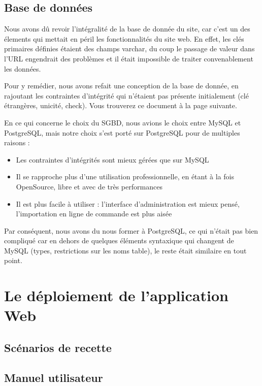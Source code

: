 \documentclass[11pt]{report}
\begin{document}
\section{Base de données}
Nous avons dû revoir l'intégralité de la base de donnée du site, car c'est un
des élements qui mettait en péril les fonctionnalités du site web. En effet, les
clés primaires définies étaient des champs varchar, du coup le passage de valeur
dans l'URL engendrait des problèmes et il était impossible de traiter
convenablement les données. \\

\par Pour y remédier, nous avons refait une conception de la base de donnée, en
rajoutant les contraintes d'intégrité qui n'étaient pas présente initialement
(clé étrangères, unicité, check). Vous trouverez ce document à la page suivante.
\\

\par En ce qui concerne le choix du SGBD, nous avions le choix entre MySQL et
PostgreSQL, mais notre choix s'est porté sur PostgreSQL pour de multiples
raisons : \\
\begin{itemize}
  \item Les contraintes d'intégrités sont mieux gérées que sur MySQL
  \item Il se rapproche plus d'une utilisation professionnelle, en étant à la
  fois OpenSource, libre et avec de très performances
  \item Il est plus facile à utiliser : l'interface d'administration est mieux
  pensé, l'importation en ligne de commande est plus aisée \\
\end{itemize}

\par Par conséquent, nous avons du nous former à PostgreSQL, ce qui n'était pas
bien compliqué car en dehors de quelques éléments syntaxique qui changent de
MySQL (types, restrictions sur les noms table), le reste était similaire en tout
point.

\chapter{Le déploiement de l'application Web}
\section{Scénarios de recette}
\section{Manuel utilisateur}
\end{document}
